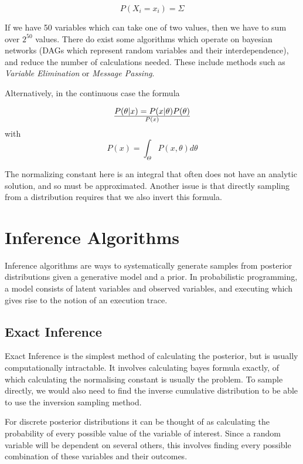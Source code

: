 $$P(X_i=x_i) = \Sigma_{} $$

If we have 50 variables which can take one of two values, then we have to sum over $2^{50}$ values. There do exist some algorithms which operate on bayesian networks (DAGs which represent random variables and their interdependence), and reduce the number of calculations needed. These include methods such as \textit{Variable Elimination} or \textit{Message Passing}.

Alternatively, in the continuous case the formula 

$$P(\theta|x)=P(x|\theta)P(\theta)\over{P(x)}$$
with 
$$ P(x)=\int_{\Theta}P(x,\theta)d\theta $$

The normalizing constant here is an integral that often does not have an analytic solution, and so must be approximated. Another issue is that directly sampling from a distribution requires that we also invert this formula.

\section{Inference Algorithms}

Inference algorithms are ways to systematically generate samples from posterior distributions given a generative model and a prior. In probabilistic programming, a model consists of latent variables and observed variables, and executing  which gives rise to the notion of an execution trace.

\subsection{Exact Inference}

Exact Inference is the simplest method of calculating the posterior, but is usually computationally intractable. It involves calculating bayes formula exactly, of which calculating the normalising constant is usually the problem. To sample directly, we would also need to find the inverse cumulative distribution to be able to use the inversion sampling method.

For discrete posterior distributions it can be thought of as calculating the probability of every possible value of the variable of interest. Since a random variable will be dependent on several others, this involves finding every possible combination of these variables and their outcomes.


